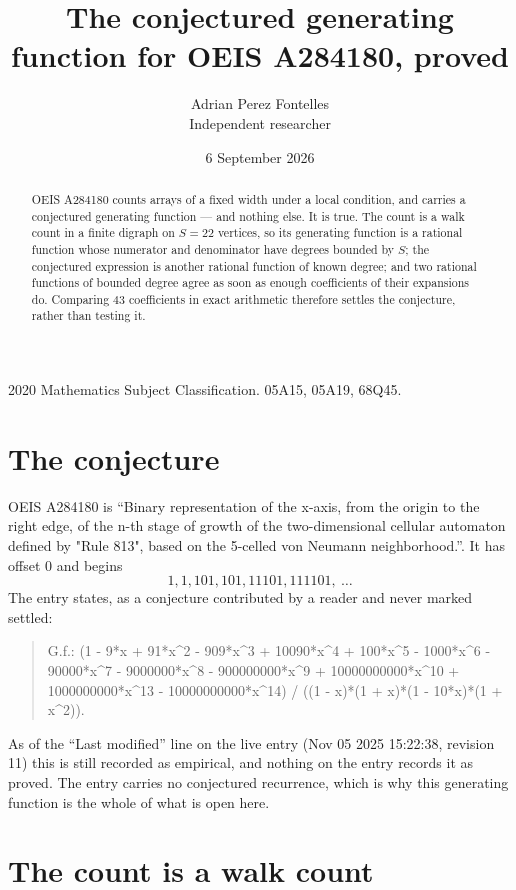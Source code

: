 \documentclass[11pt,a4paper]{article}
\title{The conjectured generating function for OEIS A284180, proved}
\author{Adrian Perez Fontelles\\ \small Independent researcher}
\date{6 September 2026}
\theoremstyle{plain}
\theoremstyle{definition}
\begin{document}
\maketitle

\begin{abstract}
OEIS A284180 counts arrays of a fixed width under a local condition, and carries a conjectured
generating function --- and nothing else. It is true. The count is a walk count in a finite
digraph on $S=22$ vertices, so its generating function is a rational function whose numerator
and denominator have degrees bounded by $S$; the conjectured expression is another rational
function of known degree; and two rational functions of bounded degree agree as soon as enough
coefficients of their expansions do. Comparing $43$ coefficients in exact arithmetic
therefore settles the conjecture, rather than testing it.
\end{abstract}

\noindent\small 2020 Mathematics Subject Classification. 05A15, 05A19, 68Q45.\normalsize

\section{The conjecture}

OEIS A284180 is ``Binary representation of the x-axis, from the origin to the right edge, of the n-th stage of growth of the two-dimensional cellular automaton defined by "Rule 813", based on the 5-celled von Neumann neighborhood.''. It has offset $0$ and begins
\[
1, 1, 101, 101, 11101, 111101,\ \dots
\]
The entry states, as a conjecture contributed by a reader and never marked settled:
\begin{quote}
G.f.: (1 - 9*x + 91*x\^{}2 - 909*x\^{}3 + 10090*x\^{}4 + 100*x\^{}5 - 1000*x\^{}6 - 90000*x\^{}7 - 9000000*x\^{}8 - 900000000*x\^{}9 + 10000000000*x\^{}10 + 1000000000*x\^{}13 - 10000000000*x\^{}14) / ((1 - x)*(1 + x)*(1 - 10*x)*(1 + x\^{}2)).
\end{quote}
As of the ``Last modified'' line on the live entry (Nov 05 2025 15:22:38, revision 11) this is still
recorded as empirical, and nothing on the entry records it as proved. The entry carries no
conjectured recurrence, which is why this generating function is the whole of what is open
here.

\section{The count is a walk count}
\end{document}
